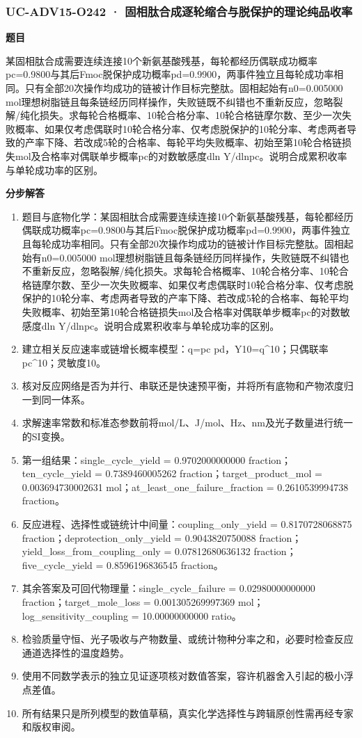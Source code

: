 \documentclass[UTF8,11pt,a4paper]{ctexart}
\begin{document}
\subsubsection*{UC-ADV15-O242 · 固相肽合成逐轮缩合与脱保护的理论纯品收率}
\noindent\textbf{题目}\par
某固相肽合成需要连续连接10个新氨基酸残基，每轮都经历偶联成功概率pc=0.9800与其后Fmoc脱保护成功概率pd=0.9900，两事件独立且每轮成功率相同。只有全部20次操作均成功的链被计作目标完整肽。固相起始有n0=0.005000 mol理想树脂链且每条链经历同样操作，失败链既不纠错也不重新反应，忽略裂解/纯化损失。求每轮合格概率、10轮合格分率、10轮合格链摩尔数、至少一次失败概率、如果仅考虑偶联时10轮合格分率、仅考虑脱保护的10轮分率、考虑两者导致的产率下降、若改成5轮的合格率、每轮平均失败概率、初始至第10轮合格链损失mol及合格率对偶联单步概率pc的对数敏感度dln Y/dlnpc。说明合成累积收率与单轮成功率的区别。\par
\medskip\noindent\textbf{分步解答}
\begin{enumerate}
\item 题目与底物化学：某固相肽合成需要连续连接10个新氨基酸残基，每轮都经历偶联成功概率pc=0.9800与其后Fmoc脱保护成功概率pd=0.9900，两事件独立且每轮成功率相同。只有全部20次操作均成功的链被计作目标完整肽。固相起始有n0=0.005000 mol理想树脂链且每条链经历同样操作，失败链既不纠错也不重新反应，忽略裂解/纯化损失。求每轮合格概率、10轮合格分率、10轮合格链摩尔数、至少一次失败概率、如果仅考虑偶联时10轮合格分率、仅考虑脱保护的10轮分率、考虑两者导致的产率下降、若改成5轮的合格率、每轮平均失败概率、初始至第10轮合格链损失mol及合格率对偶联单步概率pc的对数敏感度dln Y/dlnpc。说明合成累积收率与单轮成功率的区别。
\item 建立相关反应速率或链增长概率模型：q=pc pd，Y10=q\textasciicircum{}10；只偶联率pc\textasciicircum{}10；灵敏度10。
\item 核对反应网络是否为并行、串联还是快速预平衡，并将所有底物和产物浓度归一到同一体系。
\item 求解速率常数和标准态参数前将mol/L、J/mol、Hz、nm及光子数量进行统一的SI变换。
\item 第一组结果：single\_cycle\_yield = 0.9702000000000 fraction；ten\_cycle\_yield = 0.7389460005262 fraction；target\_product\_mol = 0.003694730002631 mol；at\_least\_one\_failure\_fraction = 0.2610539994738 fraction。
\item 反应进程、选择性或链统计中间量：coupling\_only\_yield = 0.8170728068875 fraction；deprotection\_only\_yield = 0.9043820750088 fraction；yield\_loss\_from\_coupling\_only = 0.07812680636132 fraction；five\_cycle\_yield = 0.8596196836545 fraction。
\item 其余答案及可回代物理量：single\_cycle\_failure = 0.02980000000000 fraction；target\_mole\_loss = 0.001305269997369 mol；log\_sensitivity\_coupling = 10.00000000000 ratio。
\item 检验质量守恒、光子吸收与产物数量、或统计物种分率之和，必要时检查反应通道选择性的温度趋势。
\item 使用不同数学表示的独立见证逐项核对数值答案，容许机器舍入引起的极小浮点差值。
\item 所有结果只是所列模型的数值草稿，真实化学选择性与跨辑原创性需再经专家和版权审阅。
\end{enumerate}
\end{document}
